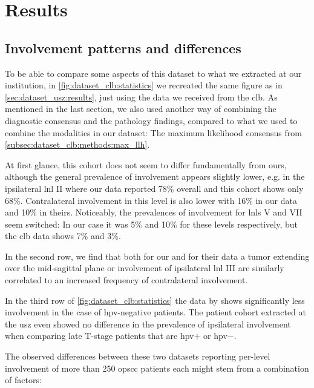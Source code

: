 \documentclass[\relativeRoot/main.tex]{subfiles}
\begin{document}
\section{Results}
\label{sec:dataset_clb:results}

\subsection{Involvement patterns and differences}
\label{subsec:dataset_clb:results:patterns}

To be able to compare some aspects of this dataset to what we extracted at our institution, in \cref{fig:dataset_clb:statistics} we recreated the same figure as in \cref{sec:dataset_usz:results}, just using the data we received from the \acrlong{clb}. As mentioned in the last section, we also used another way of combining the diagnostic consensus and the pathology findings, compared to what we used to combine the modalities in our dataset: The maximum likelihood consensus from \cref{subsec:dataset_clb:methods:max_llh}.

At first glance, this cohort does not seem to differ fundamentally from ours, although the general prevalence of involvement appears slightly lower, e.g. in the ipsilateral \gls{lnl} II where our data reported 78\% overall and this cohort shows only 68\%. Contralateral involvement in this level is also lower with 16\% in our data and 10\% in theirs. Noticeably, the prevalences of involvement for \glspl{lnl} V and VII seem switched: In our case it was 5\% and 10\% for these levels respectively, but the \gls{clb} data shows 7\% and 3\%.

In the second row, we find that both for our and for their data a tumor extending over the mid-sagittal plane or involvement of ipsilateral \gls{lnl} III are similarly correlated to an increased frequency of contralateral involvement.

In the third row of \cref{fig:dataset_clb:statistics} the data by  shows significantly less involvement in the case of \gls{hpv}-negative patients. The patient cohort extracted at the \gls{usz} even showed no difference in the prevalence of ipsilateral involvement when comparing late T-stage patients that are \gls{hpv}$+$ or \gls{hpv}$-$.

The observed differences between these two datasets reporting per-level involvement of more than 250 \gls{opscc} patients each might stem from a combination of factors:
\end{document}
